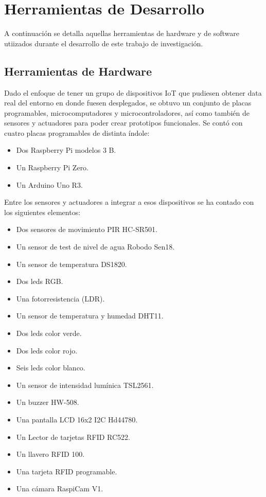 \section{Herramientas de Desarrollo}
A continuación se detalla aquellas herramientas de hardware y de software utiizados durante el desarrollo de este trabajo de investigación.

\subsection{Herramientas de Hardware}
Dado el enfoque de tener un grupo de dispositivos IoT que pudiesen obtener data real del entorno en donde fuesen desplegados, se obtuvo un conjunto de placas programables, microcomputadores y microcontroladores, así como también de sensores y actuadores para poder crear prototipos funcionales. Se contó con cuatro placas programables de distinta índole:
\begin{itemize}
\item Dos Raspberry Pi modelos 3 B.
\item Un Raspberry Pi Zero.
\item Un Arduino Uno R3.
\end{itemize}

Entre los sensores y actuadores a integrar a esos dispositivos se ha contado con los siguientes elementos:
\begin{itemize}
\item Dos sensores de movimiento PIR HC-SR501.
\item Un sensor de test de nivel de agua Robodo Sen18.
\item Un sensor de temperatura DS1820.
\item Dos leds RGB.
\item Una fotorresistencia (LDR).
\item Un sensor de temperatura y humedad DHT11.
\item Dos leds color verde.
\item Dos leds color rojo.
\item Seis leds color blanco.
\item Un sensor de intensidad lumínica TSL2561.
\item Un buzzer HW-508.
\item Una pantalla LCD 16x2 I2C Hd44780.
\item Un Lector de tarjetas RFID RC522.
\item Un llavero RFID 100.
\item Una tarjeta RFID programable. 
\item Una cámara RaspiCam V1.  
\end{itemize}

